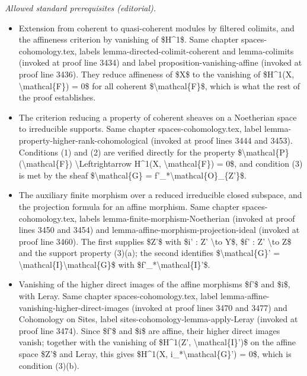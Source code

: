 \documentclass[10pt,a4paper]{amsart}
\theoremstyle{plain}
\theoremstyle{definition}
\theoremstyle{remark}
\numberwithin{equation}{subsection}
\begin{document}
\noindent\textit{Allowed standard prerequisites (editorial).}\begin{itemize}
\item Extension from coherent to quasi-coherent modules by filtered colimits, and the affineness criterion by vanishing of \$H\textasciicircum{}1\$. Same chapter spaces-cohomology.tex, labels lemma-directed-colimit-coherent and lemma-colimits (invoked at proof line 3434) and label proposition-vanishing-affine (invoked at proof line 3436). They reduce affineness of \$X\$ to the vanishing of \$H\textasciicircum{}1(X, \textbackslash{}mathcal\{F\}) = 0\$ for all coherent \$\textbackslash{}mathcal\{F\}\$, which is what the rest of the proof establishes.
\item The criterion reducing a property of coherent sheaves on a Noetherian space to irreducible supports. Same chapter spaces-cohomology.tex, label lemma-property-higher-rank-cohomological (invoked at proof lines 3444 and 3453). Conditions (1) and (2) are verified directly for the property \$\textbackslash{}mathcal\{P\}(\textbackslash{}mathcal\{F\}) \textbackslash{}Leftrightarrow H\textasciicircum{}1(X, \textbackslash{}mathcal\{F\}) = 0\$, and condition (3) is met by the sheaf \$\textbackslash{}mathcal\{G\} = f'\_*\textbackslash{}mathcal\{O\}\_\{Z'\}\$.
\item The auxiliary finite morphism over a reduced irreducible closed subspace, and the projection formula for an affine morphism. Same chapter spaces-cohomology.tex, labels lemma-finite-morphism-Noetherian (invoked at proof lines 3450 and 3454) and lemma-affine-morphism-projection-ideal (invoked at proof line 3460). The first supplies \$Z'\$ with \$i' : Z' \textbackslash{}to Y\$, \$f' : Z' \textbackslash{}to Z\$ and the support property (3)(a); the second identifies \$\textbackslash{}mathcal\{G\}' = \textbackslash{}mathcal\{I\}\textbackslash{}mathcal\{G\}\$ with \$f'\_*\textbackslash{}mathcal\{I\}'\$.
\item Vanishing of the higher direct images of the affine morphisms \$f'\$ and \$i\$, with Leray. Same chapter spaces-cohomology.tex, label lemma-affine-vanishing-higher-direct-images (invoked at proof lines 3470 and 3477) and Cohomology on Sites, label sites-cohomology-lemma-apply-Leray (invoked at proof line 3474). Since \$f'\$ and \$i\$ are affine, their higher direct images vanish; together with the vanishing of \$H\textasciicircum{}1(Z', \textbackslash{}mathcal\{I\}')\$ on the affine space \$Z'\$ and Leray, this gives \$H\textasciicircum{}1(X, i\_*\textbackslash{}mathcal\{G\}') = 0\$, which is condition (3)(b).
\end{itemize}\medskip
\end{document}
